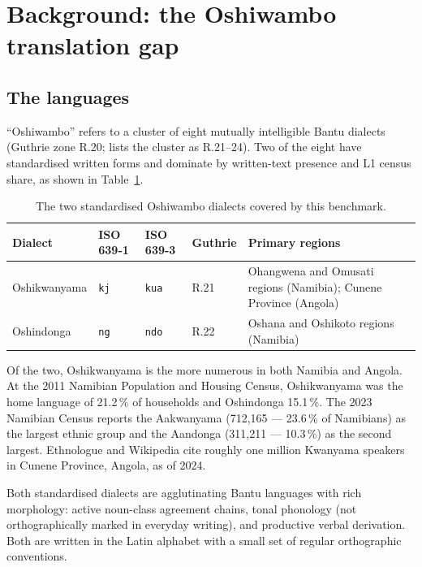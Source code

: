 \documentclass[11pt]{article}
\begin{document}
\section{Background: the Oshiwambo translation gap}
\label{sec:background}

\subsection{The languages}

``Oshiwambo'' refers to a cluster of eight mutually intelligible
Bantu dialects (Guthrie zone R.20; \citealp{maho2009nugl} lists the
cluster as R.21--24). Two of the eight have standardised written
forms and dominate by written-text presence and L1 census share, as
shown in Table~\ref{tab:dialects}.

\begin{table}[t]
\centering
\small
\begin{tabular}{lllll}
\toprule
\textbf{Dialect} & \textbf{ISO 639-1} & \textbf{ISO 639-3} & \textbf{Guthrie} & \textbf{Primary regions} \\
\midrule
Oshikwanyama & \texttt{kj} & \texttt{kua} & R.21 & Ohangwena and Omusati regions (Namibia); Cunene Province (Angola) \\
Oshindonga & \texttt{ng} & \texttt{ndo} & R.22 & Oshana and Oshikoto regions (Namibia) \\
\bottomrule
\end{tabular}
\caption{The two standardised Oshiwambo dialects covered by this benchmark.}
\label{tab:dialects}
\end{table}

Of the two, Oshikwanyama is the more numerous in both Namibia and
Angola. At the 2011 Namibian Population and Housing Census,
Oshikwanyama was the home language of 21.2\,\% of households and
Oshindonga 15.1\,\%. The 2023 Namibian Census
\citep{nsa2024census} reports the Aakwanyama (712{,}165 --- 23.6\,\%
of Namibians) as the largest ethnic group and the Aandonga
(311{,}211 --- 10.3\,\%) as the second largest. Ethnologue and
Wikipedia cite roughly one million Kwanyama speakers in Cunene
Province, Angola, as of 2024.

Both standardised dialects are agglutinating Bantu languages with
rich morphology: active noun-class agreement chains, tonal
phonology (not orthographically marked in everyday writing), and
productive verbal derivation. Both are written in the Latin
alphabet with a small set of regular orthographic conventions.
\end{document}
